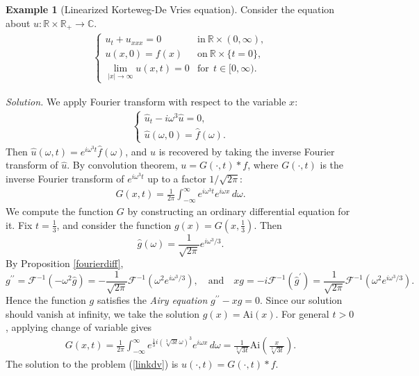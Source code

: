 \documentclass{article}
\numberwithin{equation}{section}
\newcommand{\bbC}{\mathbb{C}}
\newcommand{\bbR}{\mathbb{R}}
\renewcommand{\cal}{\mathcal}
\newcommand{\wh}{\widehat}
\theoremstyle{plain}
\theoremstyle{definition}
\newtheorem{example}[theorem]{Example}
\begin{document}
\begin{example}[Linearized Korteweg-De Vries equation] Consider the equation about $u:\bbR\times\bbR_+\to\bbC$.
\begin{align}
\begin{cases}
	u_t+u_{xxx}=0 &\mathrm{in}\ \bbR\times(0,\infty),\\
	u(x,0)=f(x) &\mathrm{on}\ \bbR\times\{t=0\},\\
	\lim_{\vert x\vert\to\infty}u(x,t)=0& \mathrm{for}\ \ t\in[0,\infty).
\end{cases}\label{linkdv}
\end{align}
\end{example}
\textit{\hspace{-1.5em}Solution.} We apply Fourier transform with respect to the variable $x$:
\begin{align*}
	\begin{cases}
		\wh{u}_t-i\omega^3\wh{u}=0,\\
		\wh{u}(\omega,0)=\wh{f}(\omega).
	\end{cases}
\end{align*}
Then $\wh{u}(\omega,t)=e^{i\omega^3t}\wh{f}(\omega)$, and $u$ is recovered by taking the inverse Fourier transform of $\wh{u}$. By convolution theorem, $u=G(\cdot,t)*f$, where $G(\cdot,t)$ is the inverse Fourier transform of $e^{i\omega^3t}$ up to a factor $1/\sqrt{2\pi}$:
\begin{align*}
	G(x,t)=\frac{1}{2\pi}\int_{-\infty}^\infty e^{i\omega^3 t}e^{i\omega x}\,d\omega.
\end{align*}
We compute the function $G$ by constructing an ordinary differential equation for it. Fix $t=\frac{1}{3}$, and consider the function $g(x)=G(x,\frac{1}{3})$. Then $$\wh{g}(\omega)=\frac{1}{\sqrt{2\pi}}e^{i\omega^3/3}.$$
By Proposition \ref{fourierdiff}, $$g^{\prime\prime}=\cal{F}^{-1}(-\omega^2\wh{g})=-\frac{1}{\sqrt{2\pi}}\cal{F}^{-1}\left(\omega^2 e^{i\omega^3/3}\right),\quad\mathrm{and}\quad xg=-i\cal{F}^{-1}(\wh{g}^\prime)=\frac{1}{\sqrt{2\pi}}\cal{F}^{-1}\left(\omega^2e^{i\omega^3/3}\right).$$
Hence the function $g$ satisfies the \textit{Airy equation} $g^{\prime\prime}-xg=0$. Since our solution should vanish at infinity, we take the solution $g(x)=\mathrm{Ai}(x)$. For general $t>0$, applying change of variable gives
\begin{align*}
	G(x,t)=\frac{1}{2\pi}\int_{-\infty}^\infty e^{\frac{1}{3}i\left(\sqrt[3]{3t}\omega\right)^3}e^{i\omega x}\,d\omega=\frac{1}{\sqrt[3]{3t}}\mathrm{Ai}\left(\frac{x}{\sqrt[3]{3t}}\right).
\end{align*}
The solution to the problem (\ref{linkdv}) is $u(\cdot,t)=G(\cdot,t)* f$.
\end{document}
